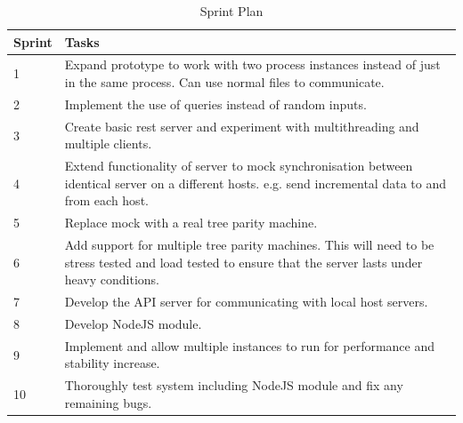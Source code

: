 \begin{table}[h]
\centering
\caption{Sprint Plan}
\begin{tabular}{|p{1cm}|p{12cm}|}
\hline Sprint & Tasks \\ [14pt]

\hline 1 & Expand prototype to work with two process instances instead of just in the same process. Can use normal files to communicate. \\ [12pt]

\hline 2 & Implement the use of queries instead of random inputs. \\ [12pt]

\hline 3 & Create basic rest server and experiment with multithreading and multiple clients. \\ [12pt]

\hline 4 & Extend functionality of server to mock synchronisation between identical server on a different hosts. e.g. send incremental data to and from each host.\\ [12pt]

\hline 5 & Replace mock with a real tree parity machine. \\ [12pt]

\hline 6 & Add support for multiple tree parity machines. This will need to be stress tested and load tested to ensure that the server lasts under heavy conditions. \\ [12pt]

\hline 7 & Develop the API server for communicating with local host servers. \\ [12pt]

\hline 8 & Develop NodeJS module. \\ [12pt]

\hline 9 & Implement and allow multiple instances to run for performance and stability increase. \\ [12pt]

\hline 10 & Thoroughly test system including NodeJS module and fix any remaining bugs. \\ [12pt]

\hline
\end{tabular} \\
\label{tab:ProjRisks}
\end{table}

\FloatBarrier



